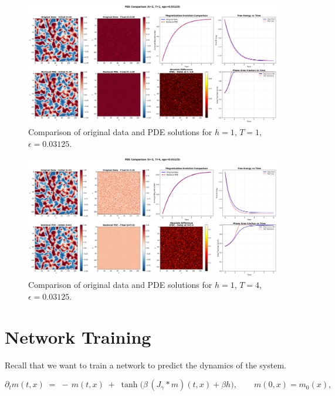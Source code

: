 \documentclass[11pt,a4paper]{article}
\begin{document}
\begin{figure}[!h]
    \centering
    \includegraphics[width=1.0\textwidth]{fig/pde_comparison_h1_T1_eps0.03125.png}
    \caption{Comparison of original data and PDE solutions for $h=1$, $T=1$, $\epsilon=0.03125$.}
\end{figure}


\begin{figure}[h]
    \centering
    \includegraphics[width=1.0\textwidth]{fig/pde_comparison_h1_T4_eps0.03125.png}
    \caption{Comparison of original data and PDE solutions for $h=1$, $T=4$, $\epsilon=0.03125$.}
\end{figure}



\section{Network Training}

Recall that we want to train a network to predict the dynamics of the system.

\begin{equation}\label{eq:nonlocal-recall}
\partial_t m(t,x) \;=\; -\,m(t,x)\;+\;\tanh\!\Big(\beta\, (J_\gamma * m)(t,x) + \beta h\Big), \qquad m(0,x)=m_0(x),
\end{equation}
\end{document}
